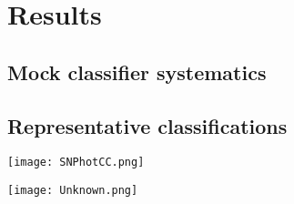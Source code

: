 \section{Results}
\label{sec:results}

\subsection{Mock classifier systematics}
\label{sec:mockresults}

\subsection{Representative classifications}
\label{sec:realresults}

\begin{figure*}
	\begin{center}
		\texttt{[image: SNPhotCC.png]}\\
		\caption{}
		\label{fig:snphotcc_metric_compare}
	\end{center}
\end{figure*}

\begin{figure*}
	\begin{center}
		\texttt{[image: Unknown.png]}\\
		\caption{}
		\label{fig:unknown_metric_compare}
	\end{center}
\end{figure*}
